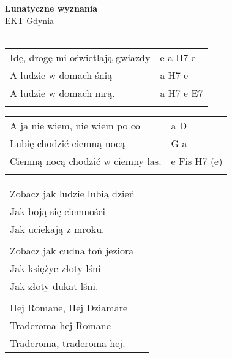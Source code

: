 \documentclass[a5paper]{article}
\begin{document}


\noindent
\fontsize{12pt}{15pt}\selectfont
\textbf{Lunatyczne wyznania} \\
\fontsize{8pt}{10pt}\selectfont
EKT Gdynia \\ \\
\fontsize{10pt}{12pt}\selectfont
{}
\begin{tabular}{@{}p{8.00cm}p{3cm}@{}}
\noindent
Idę, drogę mi oświetlają gwiazdy & e a H7 e \\
A ludzie w domach śnią & a H7 e \\
A ludzie w domach mrą. & a H7 e E7 \\ \\
\end{tabular}

\noindent
\begin{tabular}{@{}p{7.00cm}p{3cm}@{}}
	A ja nie wiem, nie wiem po co & a D \\
	Lubię chodzić ciemną nocą & G a \\
	Ciemną nocą chodzić w ciemny las. & e Fis H7 (e) \\ \\
\end{tabular}

\noindent
\begin{tabular}{@{}p{7.00cm}p{3cm}@{}}
Zobacz jak ludzie lubią dzień \\
Jak boją się ciemności \\
Jak uciekają z mroku. \\ \\

Zobacz jak cudna toń jeziora \\
Jak księżyc złoty lśni \\
Jak złoty dukat lśni. \\ \\

Hej Romane, Hej Dziamare \\
Traderoma hej Romane \\
Traderoma, traderoma hej.
\end{tabular}
\end{document}
